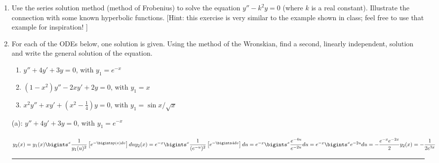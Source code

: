 \documentclass[fleqn]{article}
\begin{document}
\begin{enumerate}
    \item  Use the series solution method (method of Frobenius) to solve the equation $y'' - k^2 y =0$ (where $k$ is a real constant).  Illustrate the connection with some known hyperbolic functions. [Hint: this exercise is very similar to the example shown in class; feel free to use that example for inspiration! ]
    
    
    \item  For each of the ODEs below, one solution is given. Using the method of the Wronskian, find a second, linearly independent, solution and write the general solution of the equation. 
      \begin{enumerate}
      \item $y'' + 4 y' + 3 y =0 $, with $y_1= e^{-x}$

      \item $(1-x^2) y'' - 2 x y' + 2y=0 $, with $y_1= x$

      \item $x^2 y'' + x y' + (x^2 - \frac{1}{4})y=0 $, with $y_1=\sin x/\sqrt{x}$
      \end{enumerate}

      \textcolor{hwColor}{
        (a): $y''+4y'+3 y =0$, with $y_1=e^{-x}$ \\
        \\
        $
          y_2(x)=y_1(x) \bigints_{}^{x} \dfrac{1}{y_1(u)^2}\left[e^{-\bigints p(v)dv}\right]du \\
          \\
          y_2(x)=e^{-x} \bigints_{}^{x} \dfrac{1}{(e^{-u})^2}\left[e^{-\bigints 4dv}\right]du=e^{-x} \bigints_{}^{x} \dfrac{e^{-4u}}{e^{-2u}}du=e^{-x} \bigints_{}^{x} e^{-2u}du=-\dfrac{e^{-x} e^{-2x}}{2} \\
          \\
          y_2(x)=-\dfrac{1}{2e^{3x}}
        $
      }

      \textcolor{hwColor}{
        \rule{15cm}{1pt}
      }


\end{enumerate}
\end{document}

